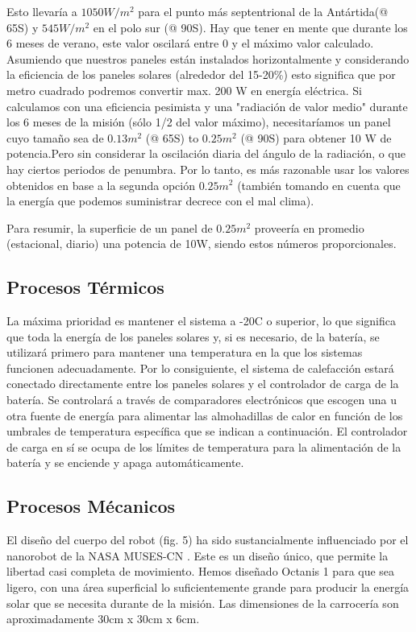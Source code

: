 \documentclass[a4paper,12pt]{article}
\begin{document}
Esto llevaría a $1050 W/m^2$ para el punto más septentrional de la Antártida(@ 65\degree S) y $545 W/m^2$ en el polo sur (@ 90\degree S). Hay que tener en mente que durante los 6 meses de verano, este valor oscilará entre 0 y el máximo valor calculado\cite{pvedu}. 
Asumiendo que nuestros paneles están instalados horizontalmente y considerando la eficiencia de los paneles solares (alrededor del 15-20\%)  esto significa que por metro cuadrado podremos convertir max. 200 W en energía eléctrica. Si calculamos con una eficiencia pesimista y una "radiación de valor medio" durante los 6 meses de la misión (sólo 1/2 del valor máximo), necesitaríamos un panel cuyo tamaño sea de $0.13m^2$ (@ 65\degree S) to $0.25m^2$ (@ 90\degree S) para obtener 10 W de potencia.Pero sin  considerar la oscilación diaria del ángulo de la radiación, o que hay ciertos periodos de penumbra. Por lo tanto, es más razonable usar los valores obtenidos en base a la segunda opción $0.25m^2$ (también tomando en cuenta que la energía que podemos suministrar decrece con el mal clima).

Para resumir, la superficie de un panel de $0.25m^2$ proveería en promedio (estacional, diario) una potencia de 10W, siendo estos números proporcionales. 


\subsection{Procesos Térmicos}

La máxima prioridad es mantener el sistema a -20\degree C o superior, lo que significa que toda la energía de los paneles solares y, si es necesario, de la batería, se utilizará primero para mantener una temperatura en la que los sistemas funcionen adecuadamente. Por lo consiguiente, el sistema de calefacción estará conectado directamente entre los paneles solares y el controlador de carga de la batería. Se controlará a través de comparadores electrónicos que escogen una u otra fuente de energía para alimentar las almohadillas de calor en función de los umbrales de temperatura específica que se indican a continuación. El controlador de carga en sí se ocupa de los límites de temperatura para la alimentación de la batería y se enciende y apaga automáticamente. 


\subsection{Procesos Mécanicos}
El diseño del cuerpo del robot (fig. 5) ha sido sustancialmente influenciado por el nanorobot de la NASA MUSES-CN \cite{muses}. Este es un diseño único, que permite la libertad casi completa de movimiento. Hemos diseñado Octanis 1 para que sea ligero, con una área superficial lo suficientemente grande para producir la energía solar que se necesita durante de la misión. Las dimensiones de la carrocería son aproximadamente 30cm x 30cm x 6cm.
\end{document}
